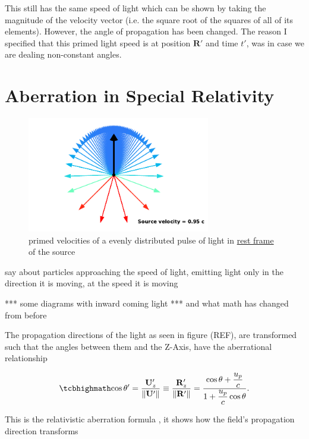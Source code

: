 This still has the same speed of light which can be shown by taking the magnitude of the velocity vector (i.e. the square root of the squares of all of its elements). However, the angle of propagation has been changed. The reason I specified that this primed light speed is at position $\mathbf{R'}$ and time $t'$, was in case we are dealing non-constant angles.

\section{Aberration in Special Relativity}

\begin{figure}[ht]
	\centering
	\includegraphics[width=8cm]{images/pdf/Aberrated_velocities.pdf}
	\caption{primed velocities of a evenly distributed pulse of light in \protect\hyperlink{def-proper-frame}{rest frame} of the source}
\end{figure}

say about particles approaching the speed of light, emitting light only in the direction it is moving, at the speed it is moving

*** some diagrams with inward coming light ***
and what math has changed from before

The propagation directions of the light as seen in figure (REF), are transformed such that the angles between them and the Z-Axis, have the aberrational relationship

\begin{equation}
	\label{Cosine transform}
	\mhl{
	\cos\theta' = \frac{\mathbf{U}'_z}{\|\mathbf{U}'\|} \equiv \frac{\mathbf{R}'_{z}}{\|\mathbf{R}'\|} =  \dfrac{\cos\theta + \dfrac{u_p}{c}}{1+\dfrac{u_p}{c}\cos\theta}.
	}
\end{equation}

This is the relativistic aberration formula \cite{einstein1905electrodynamics}, it shows how the field's propagation direction transforms

